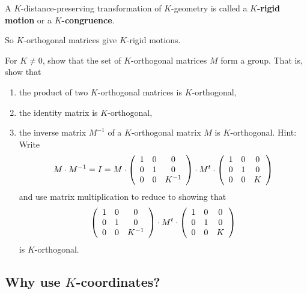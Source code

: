 \documentclass{ximera}
\begin{document}
\begin{definition}
A $K$-distance-preserving transformation of $K$-geometry is called a
$K$\textbf{-rigid motion} or a $K$\textbf{-congruence}.
\end{definition}

So $K$-orthogonal matrices give $K$-rigid motions.

\begin{exercise}
For $K\neq0$, show that the set of $K$-orthogonal matrices $M$ form a group.
That is, show that
\begin{enumerate}
\item the product of two $K$-orthogonal matrices is $K$-orthogonal,

\item the identity matrix is $K$-orthogonal,

\item the inverse matrix $M^{-1}$ of a $K$-orthogonal matrix $M$ is $K$-orthogonal.
Hint: Write%
\[
M\cdot M^{-1}=I=M\cdot\left(
\begin{array}
[c]{ccc}%
1 & 0 & 0\\
0 & 1 & 0\\
0 & 0 & K^{-1}%
\end{array}
\right)  \cdot M^{t}\cdot\left(
\begin{array}
[c]{ccc}%
1 & 0 & 0\\
0 & 1 & 0\\
0 & 0 & K
\end{array}
\right)
\]
and use matrix multiplication to reduce to showing that
\[
\left(
\begin{array}
[c]{ccc}%
1 & 0 & 0\\
0 & 1 & 0\\
0 & 0 & K^{-1}%
\end{array}
\right)  \cdot M^{t}\cdot\left(
\begin{array}
[c]{ccc}%
1 & 0 & 0\\
0 & 1 & 0\\
0 & 0 & K
\end{array}
\right)
\]
is $K$-orthogonal.
\end{enumerate}
\end{exercise}

\subsection*{Why use $K$-coordinates?}
\end{document}
